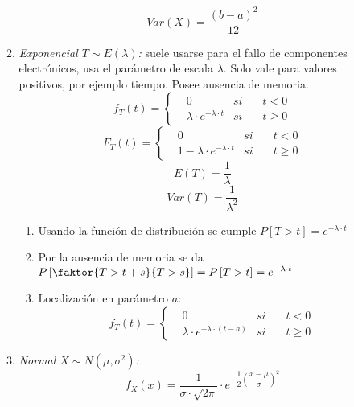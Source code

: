 \documentclass[a4paper, twocolumn, 10pt]{article}
\begin{document}
\begin{itemize}
\begin{enumerate}
\begin{equation*}
			Var(X) = \frac{(b-a)^2}{12}
		\end{equation*}
		\item \textit{Exponencial $T\sim E(\lambda)$:} suele usarse para el fallo de componentes electrónicos, usa el parámetro de escala $\lambda$. Solo vale para valores positivos, por ejemplo tiempo. Posee ausencia de memoria.
		\begin{equation*}
			f_T(t) = \left\lbrace
			\begin{aligned}
			& 0 & si \quad& t < 0 \\
			& \lambda\cdot e^{-\lambda \cdot t} & si \quad & t \ge 0
			\end{aligned} \right.
		\end{equation*}
		\begin{equation*}
			F_T(t) = \left\lbrace
			\begin{aligned}
			& 0 & si \quad& t < 0 \\
			& 1 - \lambda\cdot e^{-\lambda \cdot t} & si \quad & t \ge 0
			\end{aligned} \right.
		\end{equation*}
		\begin{equation*}
			E(T) = \frac{1}{\lambda}
		\end{equation*}
		\begin{equation*}
			Var(T) = \frac{1}{\lambda^2}
		\end{equation*}
		\begin{enumerate}
			\item Usando la función de distribución se cumple $P\left[T>t\right] = e^{-\lambda\cdot t}$
			\item Por la ausencia de memoria se da $\displaystyle P\left[\faktor{T > t+s}{T>s}\right] = P\left[T>t\right] = e^{-\lambda\cdot t}$
			\item Localización en parámetro $a$:
			\begin{equation*}
			f_T(t) = \left\lbrace
			\begin{aligned}
			& 0 & si \quad& t < 0 \\
			& \lambda\cdot e^{-\lambda \cdot (t-a)} & si \quad & t \ge 0
			\end{aligned} \right.
			\end{equation*}
		\end{enumerate}
		\item \textit{Normal $X\sim N(\mu, \sigma^2)$:}
		\begin{equation*}
			f_X(x) = \frac{1}{\sigma\cdot\sqrt{2\pi}}\cdot e^{-\dfrac{1}{2}\left(\dfrac{x-\mu}{\sigma}\right)^2}

\end{equation*}
\end{enumerate}
\end{itemize}
\end{document}
